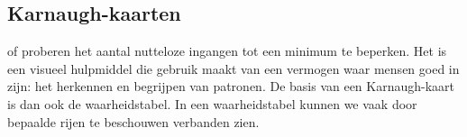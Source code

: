 \subsection{Karnaugh-kaarten}
 of  proberen het aantal nutteloze ingangen tot een minimum te beperken. Het is een visueel hulpmiddel die gebruik maakt van een vermogen waar mensen goed in zijn: het herkennen en begrijpen van patronen. De basis van een Karnaugh-kaart is dan ook de waarheidstabel. In een waarheidstabel kunnen we vaak door bepaalde rijen te beschouwen verbanden zien.
